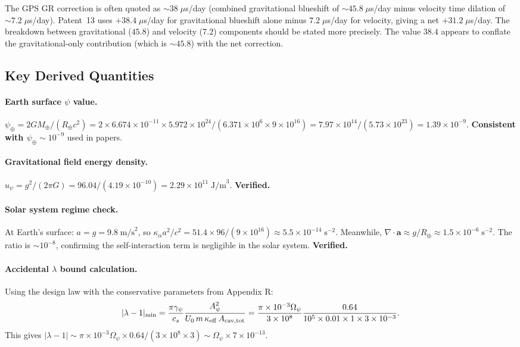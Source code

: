 \documentclass[12pt,a4paper]{article}
\begin{document}
\begin{minor}
The GPS GR correction is often quoted as $\sim 38\;\mu$s/day (combined
gravitational blueshift of $\sim 45.8\;\mu$s/day minus velocity time
dilation of $\sim 7.2\;\mu$s/day). Patent~13 uses $+38.4\;\mu$s/day
for gravitational blueshift alone minus $7.2\;\mu$s/day for velocity,
giving a net $+31.2\;\mu$s/day. The breakdown between gravitational
($45.8$) and velocity ($7.2$) components should be stated more precisely.
The value $38.4$ appears to conflate the gravitational-only contribution
(which is $\sim 45.8$) with the net correction.
\end{minor}

\subsection{Key Derived Quantities}

\paragraph{Earth surface $\psi$ value.}
$\psi_\oplus = 2GM_\oplus/(R_\oplus c^2) = 2\times 6.674\times 10^{-11}
\times 5.972\times 10^{24}/(6.371\times 10^6 \times 9\times 10^{16})
= 7.97\times 10^{14}/(5.73\times 10^{23}) = 1.39\times 10^{-9}$.
\textbf{Consistent with $\psi_\oplus \sim 10^{-9}$} used in papers.

\paragraph{Gravitational field energy density.}
$u_\psi = g^2/(2\pi G) = 96.04/(4.19\times 10^{-10})
= 2.29\times 10^{11}\;\text{J/m}^3$. \textbf{Verified.}

\paragraph{Solar system regime check.}
At Earth's surface: $a = g = 9.8\;\text{m/s}^2$, so
$\kappa_\alpha a^2/c^2 = 51.4 \times 96/(9\times 10^{16})
\approx 5.5\times 10^{-14}\;\text{s}^{-2}$. Meanwhile,
$\nabla\cdot\mathbf{a} \approx g/R_\oplus \approx 1.5\times 10^{-6}\;\text{s}^{-2}$.
The ratio is $\sim 10^{-8}$, confirming the self-interaction term is
negligible in the solar system. \textbf{Verified.}

\paragraph{Accidental $\lambda$ bound calculation.}
Using the design law with the conservative parameters from Appendix R:
\[
|\lambda - 1|_{\rm min} = \frac{\pi\gamma_\psi}{c_s}
\frac{A_\psi^2}{U_0\,m\,\kappa_{\rm eff}\,A_{\rm cav,tot}}
= \frac{\pi \times 10^{-3}\Omega_\psi}{3\times 10^8}
\frac{0.64}{10^5 \times 0.01 \times 1 \times 3\times 10^{-3}}.
\]
This gives $|\lambda-1| \sim \pi \times 10^{-3}\Omega_\psi \times
0.64/(3\times 10^8 \times 3) \sim \Omega_\psi \times 7\times 10^{-13}$.
\end{document}
